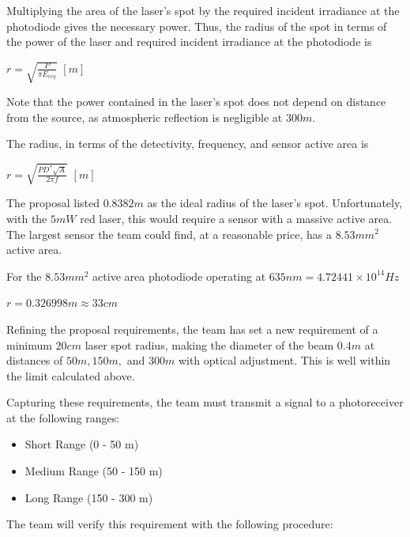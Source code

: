 \documentclass[letterpaper,10pt]{article}
\begin{document}
\begin{spacing}{1.15}
Multiplying the area of the laser's spot by the required incident irradiance at the photodiode gives the necessary power. Thus, the radius of the spot in terms of the power of the laser and required incident irradiance at the photodiode is 
\begin{center}
	{\large $r = \sqrt{\frac{P}{\pi E_{req}}}$} $[m]$
\end{center}

Note that the power contained in the laser's spot does not depend on distance from the source, as atmospheric reflection is negligible at $300 m$.

The radius, in terms of the detectivity, frequency, and sensor active area is
\begin{center}
	{\large $r = \sqrt{\frac{PD^*\sqrt{A}}{2 \pi f}}$} $[m]$
\end{center}

The proposal listed $0.8382 m$ as the ideal radius of the laser's spot. Unfortunately, with the $5mW$ red laser, this would require a sensor with a massive active area. The largest sensor the team could find, at a reasonable price, has a $8.53 mm^2$ active area. 

For the $8.53 mm^2$ active area photodiode operating at $635 nm = 4.72441 × 10^{14} Hz$ 
\begin{center}
	$r = 0.326998 m \approx 33 cm$
\end{center}

Refining the proposal requirements, the team has set a new requirement of a minimum $20 cm$ laser spot radius, making the diameter of the beam $0.4m$ at distances of $50m, 150m,$ and $300m$ with optical adjustment. This is well within the limit calculated above.  

Capturing these requirements, the team must transmit a signal to a photoreceiver at the following ranges:
\begin{itemize}
	\item Short Range (0 - 50 m)
	\item Medium Range (50 - 150 m)
	\item Long Range (150 - 300 m)
\end{itemize}

The team will verify this requirement with the following procedure:


\end{spacing}
\end{document}
